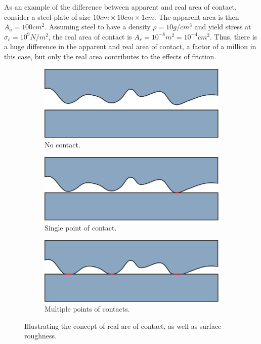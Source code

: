 \documentclass[twoside,english]{uiofysmaster}
\begin{document}
As an example of the difference between apparent and real area of contact, consider a steel plate of size $10cm\times10cm\times1cm$. The apparent area is then $A_a=100cm^2$. Assuming steel to have a density $\rho=10g/cm^3$ and yield stress at $\sigma_c=10^9N/m^2$, the real area of contact is $A_r = 10^{-8}m^2 = 10^{-4}cm^2$.
Thus, there is a huge difference in the apparent and real area of contact, a factor of a million in this case, but only the real area contributes to the effects of friction. 

\begin{figure}
	\centering
	\begin{subfigure}{\textwidth}
		\centering
		\includegraphics[width=0.5\linewidth]{figures/friction/areaOfContact/apart.pdf}
		\caption{No contact.}
		\label{fig:realAreaOfContact0}
	\end{subfigure}
	\begin{subfigure}{\textwidth}
		\vspace{5mm}
		\centering
		\includegraphics[width=0.5\linewidth]{figures/friction/areaOfContact/single.pdf}
		\caption{Single point of contact.}
		\label{fig:realAreaOfContact1}
	\end{subfigure}
	\begin{subfigure}{\textwidth}
	\vspace{5mm}
	\centering
	\includegraphics[width=0.5\linewidth]{figures/friction/areaOfContact/three.pdf}
	\caption{Multiple points of contacts.}
	\label{fig:realAreaOfContact3}
\end{subfigure}
\caption{Illustrating the concept of real are of contact, as well as surface roughness. }
\label{fig:realAreaOfContact}
\end{figure}
\end{document}
